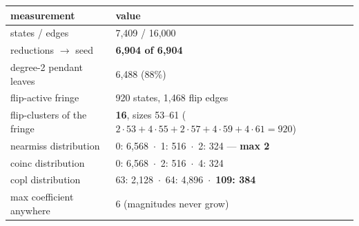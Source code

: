 \documentclass[10pt]{article}
\begin{document}
\begin{center}
\begin{tabular}{@{}ll@{}}
\toprule
measurement & value\\
\midrule
states / edges & 7{,}409 / 16{,}000\\
reductions $\to$ seed & \textbf{6{,}904 of 6{,}904}\\
degree-2 pendant leaves & 6{,}488 (88\%)\\
flip-active fringe & 920 states, 1{,}468 flip edges\\
flip-clusters of the fringe & \textbf{16}, sizes 53--61 ($2{\cdot}53 + 4{\cdot}55 + 2{\cdot}57 + 4{\cdot}59 + 4{\cdot}61 = 920$)\\
nearmiss distribution & 0: 6{,}568 \,$\cdot$\, 1: 516 \,$\cdot$\, 2: 324 --- \textbf{max 2}\\
coinc distribution & 0: 6{,}568 \,$\cdot$\, 2: 516 \,$\cdot$\, 4: 324\\
copl distribution & 63: 2{,}128 \,$\cdot$\, 64: 4{,}896 \,$\cdot$\, \textbf{109: 384}\\
max coefficient anywhere & 6 (magnitudes never grow)\\
\bottomrule
\end{tabular}
\end{center}
\end{document}
